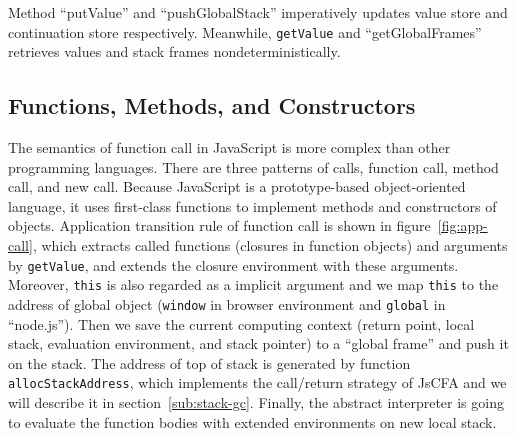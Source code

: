 \documentclass{article}
\begin{document}
Method ``putValue'' and ``pushGlobalStack'' imperatively updates value store and continuation store respectively. Meanwhile, \verb|getValue| and ``getGlobalFrames'' retrieves values and stack frames nondeterministically.

\subsection{Functions, Methods, and Constructors}
\label{sub:Functions, Methods, and Constructors}

The semantics of function call in JavaScript is more complex than other programming languages. There are three patterns of calls, function call, method call, and new call. Because JavaScript is a prototype-based object-oriented language, it uses first-class functions to implement methods and constructors of objects.
Application transition rule of function call is shown in figure~\ref{fig:app-call}, which extracts called functions (closures in function objects) and arguments by \verb|getValue|, and extends the closure environment with these arguments. Moreover, \verb|this| is also regarded as a implicit argument and we map \verb|this| to the address of global object (\verb|window| in browser environment and \verb|global| in ``node.js''). Then we save the current computing context (return point, local stack, evaluation environment, and stack pointer) to a ``global frame'' and push it on the stack. The address of top of stack is generated by function \verb|allocStackAddress|, which implements the call/return strategy of JsCFA and we will describe it in section~\ref{sub:stack-gc}. Finally, the abstract interpreter is going to evaluate the function bodies with extended environments on new local stack.
\end{document}

